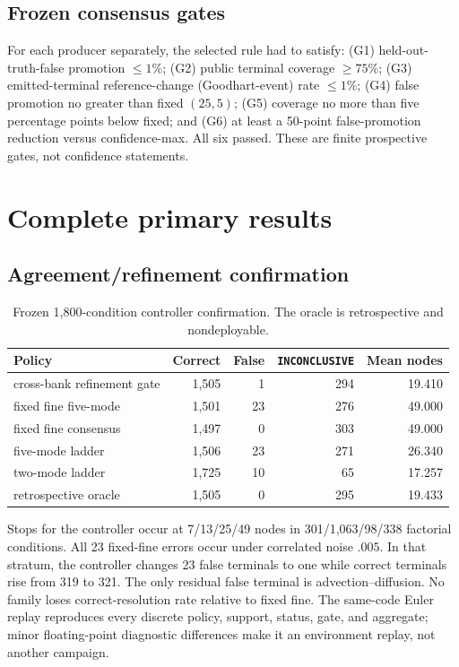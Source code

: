\documentclass{article}
\newcommand{\INC}{\texttt{INCONCLUSIVE}\xspace}
\begin{document}
\subsection{Frozen consensus gates}
For each producer separately, the selected rule had to satisfy: (G1) held-out-truth-false promotion
$\le1\%$; (G2) public terminal coverage $\ge75\%$; (G3) emitted-terminal reference-change
(Goodhart-event) rate $\le1\%$;
(G4) false promotion no greater than fixed $(25,5)$; (G5) coverage no more than five percentage
points below fixed; and (G6) at least a 50-point false-promotion reduction versus confidence-max.
All six passed. These are finite prospective gates, not confidence statements.

\section{Complete primary results}

\subsection{Agreement/refinement confirmation}
\begin{table}[ht]
\centering\small
\caption{Frozen 1,800-condition controller confirmation. The oracle is retrospective and
nondeployable.}
\begin{tabular}{lrrrr}
\toprule
Policy & Correct & False & \INC & Mean nodes \\
\midrule
cross-bank refinement gate & 1,505 & 1 & 294 & 19.410 \\
fixed fine five-mode & 1,501 & 23 & 276 & 49.000 \\
fixed fine consensus & 1,497 & 0 & 303 & 49.000 \\
five-mode ladder & 1,506 & 23 & 271 & 26.340 \\
two-mode ladder & 1,725 & 10 & 65 & 17.257 \\
retrospective oracle & 1,505 & 0 & 295 & 19.433 \\
\bottomrule
\end{tabular}
\end{table}

Stops for the controller occur at 7/13/25/49 nodes in 301/1,063/98/338 factorial conditions. All 23
fixed-fine errors occur under correlated noise $.005$. In that stratum, the controller changes
23 false terminals to one while correct terminals rise from 319 to 321. The only residual false
terminal is advection--diffusion. No family loses correct-resolution rate relative to fixed fine.
The same-code Euler replay reproduces every discrete policy, support, status, gate, and aggregate;
minor floating-point diagnostic differences make it an environment replay, not another campaign.
\end{document}
